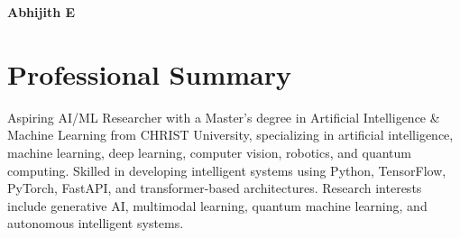 \documentclass[a4paper,10.5pt]{article}
\begin{document}

\begin{center}

{\Huge\bfseries\color{textblack} Abhijith E}

\vspace{4pt}

\small
{}

\end{center}

\vspace{2pt}


\section{Professional Summary}

\small{
Aspiring AI/ML Researcher with a Master’s degree in Artificial Intelligence \& Machine Learning from CHRIST University, specializing in artificial intelligence, machine learning, deep learning, computer vision, robotics, and quantum computing. Skilled in developing intelligent systems using Python, TensorFlow, PyTorch, FastAPI, and transformer-based architectures. Research interests include generative AI, multimodal learning, quantum machine learning, and autonomous intelligent systems.
}
\end{document}
